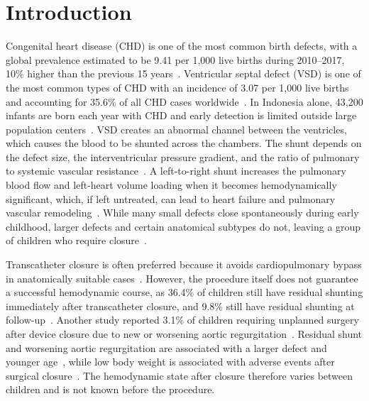 \documentclass{article}
\begin{document}
\section{Introduction}

Congenital heart disease (CHD) is one of the most common birth defects, with a global prevalence estimated to be 9.41 per 1,000 live births during 2010--2017, 10\% higher than the previous 15 years~\cite{Liu2019}. Ventricular septal defect (VSD) is one of the most common types of CHD with an incidence of 3.07 per 1,000 live births and accounting for 35.6\% of all CHD cases worldwide~\cite{Liu2019,vanderLinde2011}. In Indonesia alone, 43,200 infants are born each year with CHD and early detection is limited outside large population centers~\cite{Marwali2021}. VSD creates an abnormal channel between the ventricles, which causes the blood to be shunted across the chambers. The shunt depends on the defect size, the interventricular pressure gradient, and the ratio of pulmonary to systemic vascular resistance~\cite{Sommer2008,Rao2024}. A left-to-right shunt increases the pulmonary blood flow and left-heart volume loading when it becomes hemodynamically significant, which, if left untreated, can lead to heart failure and pulmonary vascular remodeling~\cite{Sommer2008,Arvanitaki2022}. While many small defects close spontaneously during early childhood, larger defects and certain anatomical subtypes do not, leaving a group of children who require closure~\cite{Zhang2015Spontaneous,Li2019Spontaneous}.

Transcatheter closure is often preferred because it avoids cardiopulmonary bypass in anatomically suitable cases~\cite{Turner2022,Ali_Hassan_2019}. However, the procedure itself does not guarantee a successful hemodynamic course, as 36.4\% of children still have residual shunting immediately after transcatheter closure, and 9.8\% still have residual shunting at follow-up~\cite{Vuran2026}. Another study reported 3.1\% of children requiring unplanned surgery after device closure due to new or worsening aortic regurgitation~\cite{Yang2021Surgery}. Residual shunt and worsening aortic regurgitation are associated with a larger defect and younger age~\cite{Chin2024}, while low body weight is associated with adverse events after surgical closure~\cite{Abdelrehim2022}. The hemodynamic state after closure therefore varies between children and is not known before the procedure.
\end{document}
